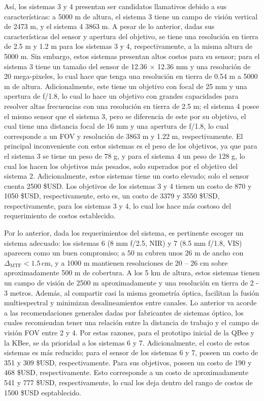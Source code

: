 \noindent Así, los sistemas 3 y 4 presentan ser candidatos llamativos debido a sus características: a 5000 m de altura, el sistema 3 tiene un campo de visión vertical de 2473 m, y el sistema 4 3863 m. A pesar de lo anterior, dadas sus características del sensor y apertura del objetivo, se tiene una resolución en tierra de 2.5 m y 1.2 m para los sistemas 3 y 4, respectivamente, a la misma altura de 5000 m. Sin embargo, estos sistemas presentan altos costos para su sensor; para el sistema 3 tiene un tamaño del sensor  de 12.36 $\times$ 12.36 mm y una resolución de 20 mega-pixeles, lo cual hace que tenga una resolución en tierra de 0.54 m a 5000 m de altura. Adicionalmente, este tiene un objetivo con focal de 25 mm y una apertura de f/1.8, lo cual lo hace un objetivo con grandes capacidades para resolver altas frecuencias con una resolución en tierra de 2.5 m; el sistema 4 posee el mismo sensor que el sistema 3, pero se diferencia de este por su objetivo, el cual tiene una distancia focal de 16 mm y una apertura de f/1.8, lo cual corresponde a un FOV y resolución de 3863 m y 1.22 m, respectivamente. El principal inconveniente con estos sistemas es el peso de los objetivos, ya que para el sistema 3 se tiene un peso de 78 g, y para el sistema 4 un peso de 128 g, lo cual los hacen los objetivos más pesados, solo superados por el objetivo del sistema 2. Adicionalmente, estos sistemas tiene un costo elevado; solo el sensor cuenta 2500 \$USD. Los objetivos de los sistemas 3 y 4 tienen un costo de 870 y 1050 \$USD, respectivamente, esto es, un costo de 3379 y 3550 \$USD, respectivamente, para los sistemas 3 y 4, lo cual los hace más costoso del requerimiento de costos establecido.

Por lo anterior, dada los requerimientos del sistema, es pertinente escoger un sistema adecuado: los sistemas 6 (8 mm f/2.5, NIR) y 7 (8.5 mm f/1.8, VIS) aparecen como un buen compromiso; a 50 m cubren unos 26 m de ancho con \(\Delta_{\mathrm{MTF}}<1.5\)\,cm, y a 1000 m mantienen resoluciones de 20 – 26 cm sobre aproximadamente 500 m de cobertura. A los 5 km de altura, estos sistemas tienen un campo de visión de 2500 m aproximadamente y una resolución en tierra de 2 - 3 metros. Además, al compartir casi la misma geometría óptica, facilitan la fusión multiespectral y minimizan desalineamientos entre canales. Lo anterior va acorde a las recomendaciones generales dadas por fabricantes de sistemas óptico, los cuales recomiendan tener una relación entre la distancia de trabajo y el campo de visión FOV entre 2 y 4. Por estas razones, para el prototipo inicial de la QBee y la KBee, se da prioridad a los sistemas 6 y 7. Adicionalmente, el costo de estos sistemas es más reducido; para el sensor de los sistemas 6 y 7, poseen un costo de 351 y 309 \$USD, respectivamente. Para sus objetivos, poseen un costo de 190 y 468 \$USD, respectivamente. Esto corresponde a un costo de aproximadamente 541 y 777 \$USD, respectivamente, lo cual los deja dentro del rango de costos de 1500 \$USD esptablecido. \\


